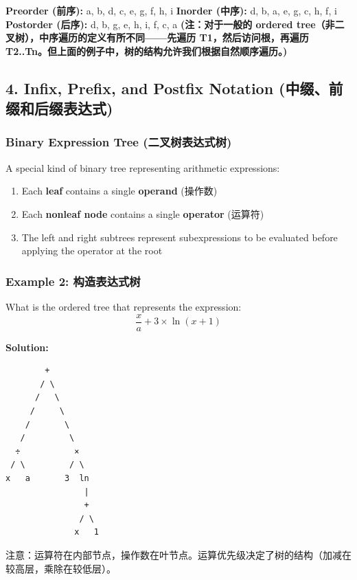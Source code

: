 \documentclass[10pt,a4paper,openany]{ctexbook}
\theoremstyle{definition}
\theoremstyle{remark}
\renewenvironment{quote}
  {\list{}{\leftmargin=1em\rightmargin=0pt\topsep=0.5pt\partopsep=0pt}\item[]}
  {\endlist}
\begin{document}
\textbf{Preorder (前序):} a, b, d, c, e, g, f, h, i
\textbf{Inorder (中序):} d, b, a, e, g, c, h, f, i
\textbf{Postorder (后序):} d, b, g, e, h, i, f, c, a
\textbf{(注：对于一般的 ordered tree（非二叉树），中序遍历的定义有所不同——先遍历 T1，然后访问根，再遍历 T2..Tn。但上面的例子中，树的结构允许我们根据自然顺序遍历。)}
\vspace{-2pt}

\subsection{4. Infix, Prefix, and Postfix Notation (中缀、前缀和后缀表达式)}

\subsubsection{Binary Expression Tree (二叉树表达式树)}

A special kind of binary tree representing arithmetic expressions:
\begin{enumerate}
\item Each \textbf{leaf} contains a single \textbf{operand} (操作数)
\item Each \textbf{nonleaf node} contains a single \textbf{operator} (运算符)
\item The left and right subtrees represent subexpressions to be evaluated before applying the operator at the root

\end{enumerate}

\subsubsection{Example 2: 构造表达式树}

What is the ordered tree that represents the expression:
\[
\frac{x}{a} + 3 \times \ln(x + 1)
\]

\textbf{Solution:}
{\footnotesize\begin{verbatim}
        +
       / \
      /   \
     /     \
    /       \
   /         \
  ÷           ×
 / \         / \
x   a       3  ln
                |
                +
               / \
              x   1
\end{verbatim}}

\begin{quote}
注意：运算符在内部节点，操作数在叶节点。运算优先级决定了树的结构（加减在较高层，乘除在较低层）。

\end{quote}
\vspace{-2pt}
\end{document}
